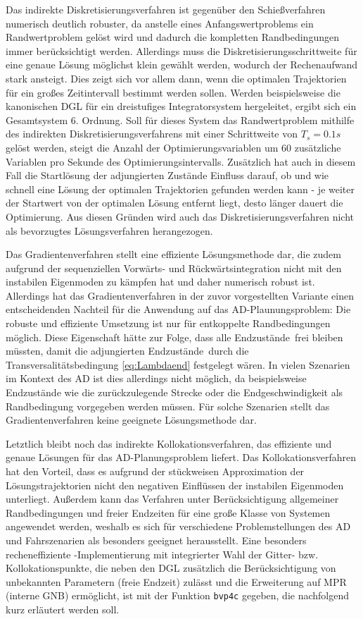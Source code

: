 Das indirekte Diskretisierungsverfahren ist gegenüber den Schießverfahren numerisch deutlich robuster, da anstelle eines Anfangswertproblems ein Randwertproblem gelöst wird und dadurch die kompletten Randbedingungen immer berücksichtigt werden. Allerdings muss die Diskretisierungsschrittweite für eine genaue Lösung möglichst klein gewählt werden, wodurch der Rechenaufwand stark ansteigt. Dies zeigt sich vor allem dann, wenn die optimalen Trajektorien für ein großes Zeitintervall bestimmt werden sollen. Werden beispielsweise die kanonischen \gls{DGL} für ein dreistufiges Integratorsystem hergeleitet, ergibt sich ein Gesamtsystem 6. Ordnung. Soll für dieses System das Randwertproblem mithilfe des indirekten Diskretisierungsverfahrens mit einer Schrittweite von $T_s = 0.1\unit{s}$ gelöst werden, steigt die Anzahl der Optimierungsvariablen um 60 zusätzliche Variablen pro Sekunde des Optimierungsintervalls. Zusätzlich hat auch in diesem Fall die Startlösung der adjungierten Zustände Einfluss darauf, ob und wie schnell eine Lösung der optimalen Trajektorien gefunden werden kann - je weiter der Startwert von der optimalen Lösung entfernt liegt, desto länger dauert die Optimierung. Aus diesen Gründen wird auch das Diskretisierungsverfahren nicht als bevorzugtes Lösungsverfahren herangezogen. 

Das Gradientenverfahren stellt eine effiziente Lösungsmethode dar, die zudem aufgrund der sequenziellen Vorwärts- und Rückwärtsintegration nicht mit den instabilen Eigenmoden zu kämpfen hat und daher numerisch robust ist. Allerdings hat das Gradientenverfahren in der zuvor vorgestellten Variante einen entscheidenden Nachteil für die Anwendung auf das \gls{AD}-Plaunungsproblem: Die robuste und effiziente Umsetzung ist nur für entkoppelte Randbedingungen möglich. Diese Eigenschaft hätte zur Folge, dass alle Endzustände \xoftf\,frei bleiben müssten, damit die adjungierten Endzustände \lambdaoftf\,durch die Transversalitätsbedingung \eqref{eq:Lambdaend} festgelegt wären. In vielen Szenarien im Kontext des \gls{AD} ist dies allerdings nicht möglich, da beispielsweise Endzustände wie die zurückzulegende Strecke oder die Endgeschwindigkeit als Randbedingung vorgegeben werden müssen. Für solche Szenarien stellt das Gradientenverfahren keine geeignete Lösungsmethode dar. 

Letztlich bleibt noch das indirekte Kollokationsverfahren, das effiziente und genaue Lösungen für das \gls{AD}-Planungsproblem liefert. Das Kollokationsverfahren hat den Vorteil, dass es aufgrund der stückweisen Approximation der Lösungstrajektorien nicht den negativen Einflüssen der instabilen Eigenmoden unterliegt. Außerdem kann das Verfahren unter Berücksichtigung allgemeiner Randbedingungen und freier Endzeiten für eine große Klasse von Systemen angewendet werden, weshalb es sich für verschiedene Problemstellungen des \gls{AD} und Fahrszenarien als besonders geeignet herausstellt. Eine besonders recheneffiziente \Matlab-Implementierung mit integrierter Wahl der Gitter- bzw. Kollokationspunkte, die neben den \gls{DGL} zusätzlich die Berücksichtigung von unbekannten Parametern (freie Endzeit) zulässt und die Erweiterung auf \gls{MPR} (interne \gls{GNB}) ermöglicht, ist mit der Funktion \texttt{bvp4c} gegeben, die nachfolgend kurz erläutert werden soll.
